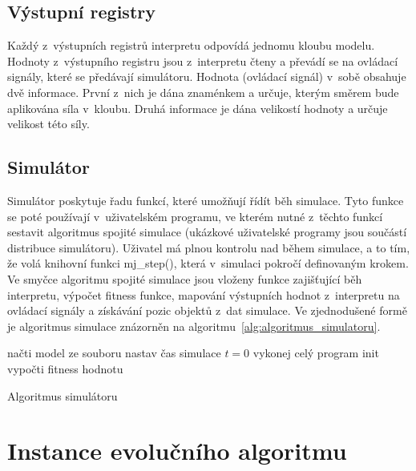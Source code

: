 \subsection{Výstupní registry}

Každý z~výstupních registrů interpretu odpovídá jednomu kloubu modelu.
Hodnoty z~výstupního registru jsou z~interpretu čteny a převádí se na ovládací signály, které se předávají simulátoru.
Hodnota (ovládací signál) v~sobě obsahuje dvě informace.
První z~nich je dána znaménkem a určuje, kterým směrem bude aplikována síla v~kloubu.
Druhá informace je dána velikostí hodnoty a určuje velikost této síly.


\subsection{Simulátor}
Simulátor poskytuje řadu funkcí, které umožňují řídít běh simulace.
Tyto funkce se poté používají v~uživatelském programu, ve kterém nutné z~těchto funkcí sestavit algoritmus spojité simulace (ukázkové uživatelské programy jsou součástí distribuce simulátoru).
Uživatel má plnou kontrolu nad během simulace, a to tím, že volá knihovní funkci mj\_step(), která v~simulaci pokročí definovaným krokem.
Ve smyčce algoritmu spojité simulace jsou vloženy funkce zajišťující běh interpretu, výpočet fitness funkce, mapování výstupních hodnot z~interpretu na ovládací signály a získávání pozic objektů z~dat simulace.
Ve zjednodušené formě je algoritmus simulace znázorněn na algoritmu~\ref{alg:algoritmus_simulatoru}.

\begin{algorithm}[H]
    načti model ze souboru\;
    nastav čas simulace $t = 0$\;
    vykonej celý program init\;
    vypočti fitness hodnotu\;
    \caption{Algoritmus simulátoru}
    \label{alg:algoritmus_simulatoru}
\end{algorithm}

\section{Instance evolučního algoritmu}
\label{sec:instance_ea}

